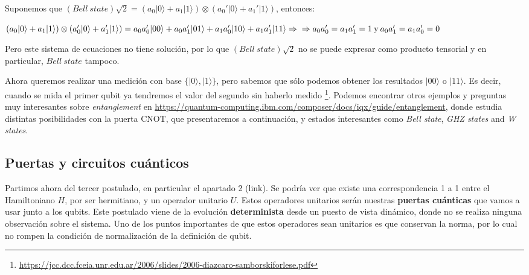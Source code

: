  Suponemos que $(Bell\:state)\sqrt{2} = (a_{0}|0\rangle+a_{1}|1\rangle) \otimes(a_{0}'|0\rangle+a_{1}'|1\rangle)$, entonces:
 
 \vspace{3pt}
     
 \begin{center}
     $(a_{0}|0\rangle+a_{1}|1\rangle)\otimes(a_{0}'|0\rangle+a_{1}'|1\rangle) =a_{0}a_{0}'|00\rangle + a_{0}a_{1}'|01\rangle + a_{1}a_{0}'|10\rangle + a_{1}a_{1}'|11\rangle \Rightarrow \\ \Rightarrow a_{0}a_{0}'=a_{1}a_{1}'=1\:\text{y}\:a_{0}a_{1}'=a_{1}a_{0}'=0$
 \end{center}
 
 \vspace{3pt}

 Pero este sistema de ecuaciones no tiene solución, por lo que $(Bell\:state)\sqrt{2}$ no se puede expresar como producto tensorial y en particular, $Bell\:state$ tampoco.\newline
 
 Ahora queremos realizar una medición con base $\{|0\rangle,|1\rangle\}$, pero sabemos que sólo podemos obtener los resultados $|00\rangle$ o $|11\rangle$. Es decir, cuando se mida el primer qubit ya tendremos el valor del segundo sin haberlo medido \footnote{\url{https://jcc.dcc.fceia.unr.edu.ar/2006/slides/2006-diazcaro-samborskiforlese.pdf}}. Podemos encontrar otros ejemplos y preguntas muy interesantes sobre \textit{entanglement} en \url{https://quantum-computing.ibm.com/composer/docs/iqx/guide/entanglement}, donde estudia distintas posibilidades con la puerta CNOT, que presentaremos a continuación, y estados interesantes como \textit{Bell state}, \textit{GHZ states} and \textit{W states}.


\subsection{Puertas y circuitos cuánticos}

 Partimos ahora del tercer postulado, en particular el apartado 2 (link). Se podría ver que existe una correspondencia 1 a 1 entre el Hamiltoniano $H$, por ser hermitiano, y un operador unitario $U$. Estos operadores unitarios serán nuestras \textbf{puertas cuánticas} que vamos a usar junto a los qubits. Este postulado viene de la evolución \textbf{determinista} desde un puesto de vista dinámico, donde no se realiza ninguna observación sobre el sistema. Uno de los puntos importantes de que estos operadores sean unitarios es que conservan la norma, por lo cual no rompen la condición de normalización de la definición de qubit. \newline
 
